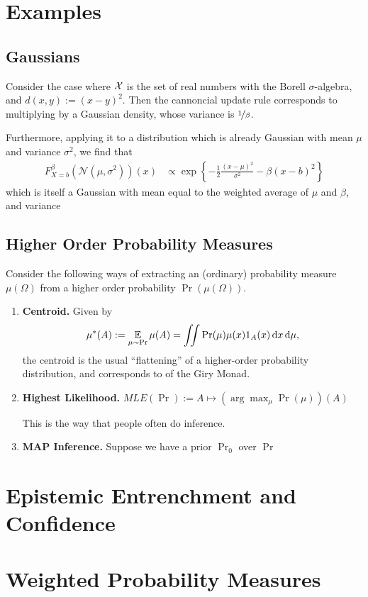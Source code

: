 \documentclass{article}
\begin{document}
\section{Examples}
\subsection{Gaussians}
Consider the case where $\mathcal X$ is the set of real numbers with the Borell $\sigma$-algebra, and $d(x,y) := (x-y)^2$.
Then the cannoncial update rule corresponds to multiplying by a Gaussian density, whose variance is $\nicefrac1\beta$. 

Furthermore, applying it to a distribution which is already Gaussian with mean $\mu$ and variance $\sigma^2$, we find that
\begin{align*}
    F^{\beta}_{X=b}(\mathcal N(\mu, \sigma^2))(x) &\propto
     \exp\left\{ - \frac12 \frac{(x-\mu)^2}{ \sigma^2 } - \beta(x-b)^2\right\}
\end{align*}
which is itself a Gaussian with mean equal to the weighted average of $\mu$ and $\beta$, and variance  


\subsection{Higher Order Probability Measures}
Consider the following ways of extracting an (ordinary) probability measure $\mu(\Omega)$
from a higher order probability $\Pr(\mu(\Omega))$.

\begin{enumerate}
    \item \textbf{Centroid.}  
        Given by 
        \[
            \mu^*(A) := \operatorname*{\mathbb{E}}_{\mu \sim \Pr} \mu(A) = 
                \iint \Pr(\mu) \mu(x) 1_{A}(x)\, \mathrm d x\,\mathrm d\mu,
        \]
        the centroid is the usual ``flattening'' of a higher-order probability distribution, and corresponds to 
        of the Giry Monad.
        
    \item \textbf{Highest Likelihood.}    
        $\textit{MLE}(\Pr) := A \mapsto (\arg\max_\mu \Pr(\mu))(A)$
        
        This is the way that people often do inference.
        
    \item \textbf{MAP Inference.}
        Suppose we have a prior $\Pr_0$ over  $\Pr$

\end{enumerate}
 

\section{Epistemic Entrenchment and Confidence}
\section{Weighted Probability Measures}
\end{document}
